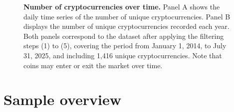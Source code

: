 \documentclass[
  12pt,
  a4paper,
  openany]{scrbook}
\begin{document}
\begin{figure}[h]


\caption[Number of cryptocurrencies over
time]{\label{fig-numcoins}\textbf{Number of cryptocurrencies over time.}
Panel A shows the daily time series of the number of unique
cryptocurrencies. Panel B displays the number of unique cryptocurrencies
recorded each year. Both panels correspond to the dataset after applying
the filtering steps (1) to (5), covering the period from January 1,
2014, to July 31, 2025, and including 1,416 unique cryptocurrencies.
Note that coins may enter or exit the market over time.}

\end{figure}%

\section{Sample overview}\label{sample-overview}
\end{document}

